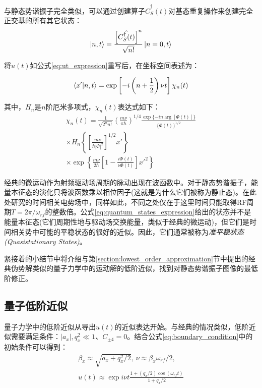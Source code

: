 与静态势谐振子完全类似，可以通过创建算子$\hat{C}_S^\dagger(t)$对基态重复操作来创建完全正交基的所有其它状态：
\begin{align}
    \ket{n,t}=\frac{\left[\hat{C_S^\dagger(t)}\right]^n}{\sqrt{n!}}\ket{n=0,t}\label{eq:basic_sattes}
\end{align}

将$u(t)$如公式\eqref{eq:ut_expression}重写后，在坐标空间表述为：

\begin{align}
    \braket{x'|n,t}=\exp\left[-i\left(n+\frac{1}{2}\right)\nu t\right]\chi_n(t) \label{eq:quantum_states_expression}
\end{align}

其中，$H_n$是$n$阶厄米多项式，$\chi_n(t)$表达式如下：
\begin{align}
    \chi_n(t)=\frac{1}{\sqrt{2^n n!}}\left(\frac{m\nu}{\pi  \hbar}\right)^{1/4}
    \frac{\exp\{-i n \arg\left[\Phi(t)\right]\}}{\{\Phi(t)\}^{1/2}}\\
    \times H_n\left\{\left[\frac{m\nu}{\hbar|\Phi|^2}\right]^{1/2}x'\right\}\\
    \times \exp\left\{\frac{m\nu }{2\hbar}\left[1-\frac{i\Phi(t)}{\nu\Phi(t)}\right]x'^2\right\}
\end{align}

经典的微运动作为射频驱动场周期的脉动出现在波函数中。对于静态势谐振子，能量本征态的演化只将波函数乘以相位因子(这就是为什么它们被称为静止态)。在此处研究的时间相关电势场中，同样如此，不同之处仅在于这里时间只能取得RF周期$T=2\pi/\omega_{rf}$的整数倍。公式\ref{eq:quantum_states_expression}给出的状态并不是能量本征态(它们周期性地与驱动场交换能量，类似于经典的微运动)，但它们是时间相关势中可能的平稳状态的很好的近似。因此，它们通常被称为\emph{准平稳状态(Quasistationary States)}。

紧接着的小结节中将介绍与第\ref{section:lowest_order_approximation}节中提出的经典伪势解类似的量子力学中的运动解的低阶近似，找到对静态势谐振子图像的最低阶修正。


\subsection[量子低阶近似]{量子低阶近似}
量子力学中的低阶近似从导出$u(t)$的近似表达开始。与经典的情况类似，低阶近似需要满足条件：$|a_x|,q_x^2\ll 1$、$C_{\pm 4}=0$。结合公式\eqref{eq:boundary_condition}中的初始条件可以得到：
\begin{align}
    \beta_x\approx\sqrt{a_x+q_x^2/2},\ \nu\approx\beta_x\omega_{rf}/2,\\
    u(t)\approx\exp{i\nu t}\frac{1+(q_x/2)\cos(\omega_{rf}t)}{1+q_x/2}\label{eq:quantum_lowest_order_approximation}
\end{align}

